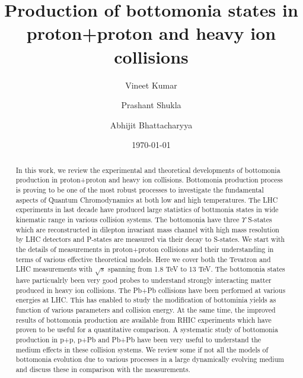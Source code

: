 \documentclass[review]{elsarticle}
\begin{document}
  \title{Production of bottomonia states in proton+proton and heavy ion collisions}
  \author[NPD]{Vineet Kumar}
  \author[NPD,HBNI]{Prashant Shukla}
  \author[UOC]{Abhijit Bhattacharyya}
  \address[NPD]{Nuclear Physics Division, Bhabha Atomic Research Centre, Mumbai 400085, India}
  \address[HBNI]{Homi Bhabha National Institute, Anushakti Nagar, Mumbai 400094, India}
  \address[UOC]{Department of Physics, University of Calcutta, 92, A. P. C. Road Kolkata-700009, India}
  \date{\today}



\fontsize{11}{15}
\selectfont


  
\begin{abstract}
    
 In this work, we review the experimental and theoretical developments of bottomonia
production in proton+proton and heavy ion collisions. Bottomonia production
process is proving to be one of the most robust processes to investigate the
fundamental aspects of Quantum Chromodynamics at both low and high temperatures.  
The LHC experiments in last decade have produced large statistics of
bottmonia states in wide kinematic range in various collision
systems. The bottomonia have three $\Upsilon$ S-states which are
reconstructed in dilepton invariant mass channel with high mass resolution by
LHC detectors and P-states are measured via their decay to S-states. 
We start with the details of measurements in proton+proton collisions and their
understanding in terms of various effective theoretical models. Here we cover both the
Tevatron and LHC measurements with $\sqrt{s}$ spanning from 1.8 TeV to 13 TeV. 
  The bottomonia states have particualrly been very good probes to understand
strongly interacting matter produced in heavy ion collisions. The Pb+Pb
collisions have been performed at various energies at LHC. This has enabled to
study the modification of bottominia yields as function of various parameters
and collision energy. At the same time, the improved results of bottomonia
production are available from RHIC experiments which have proven to be useful
for a quantitative comparison. 
 A systematic study of bottomonia production in p+p,
p+Pb and Pb+Pb have been very useful to understand the medium effects
in these collision systems. We review some if not all the models of bottomonia
evolution due to various processes in a large dynamically evolving medium and
discuss these in comparison with the measurements. 

\end{abstract}
  
\end{document}
